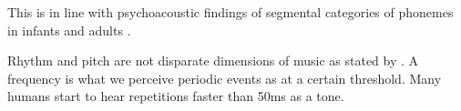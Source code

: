 This is in line with psychoacoustic findings of segmental categories of phonemes in infants and adults \citep{babies_r_l}. 

Rhythm and pitch are not disparate dimensions of music as stated by \citep{Krumhansl2000}. A frequency is what we perceive periodic events as at a certain threshold. Many humans start to hear repetitions faster than 50ms as a tone. \citep{wright2011}




%
%
%
%
%
%
%
%
%
%
%
%
%
%
%
%
%
%
